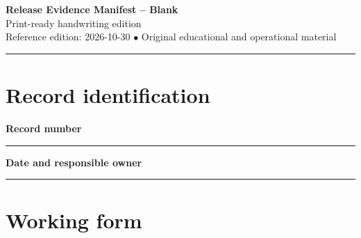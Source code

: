 \documentclass[10pt,letterpaper]{article}
\begin{document}
\begin{center}
{\LARGE\bfseries\color{cdblue}Release Evidence Manifest -- Blank}\\[7pt]
{\large Print-ready handwriting edition}\\[6pt]
{\small Reference edition: 2026-10-30 $\bullet$ Original educational and operational material}
\end{center}
\noindent\color{cdblue}\rule{\linewidth}{1.2pt}\color{black}
\vspace{0.4em}
\section{Record identification}
\textbf{Record number}\par
\noindent\rule{\linewidth}{0.35pt}\par\vspace{0.7em}
\textbf{Date and responsible owner}\par
\noindent\rule{\linewidth}{0.35pt}\par\vspace{0.7em}

\section{Working form}
\end{document}
